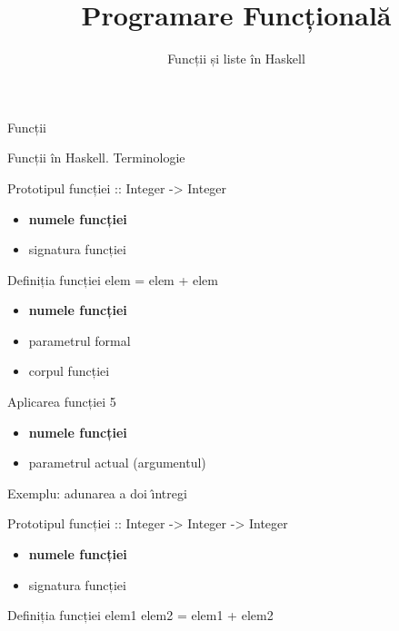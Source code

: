 \documentclass[xcolor=pdftex,romanian,colorlinks]{beamer}
\title[PF---Funcții și liste]{Programare Funcțională}
\subtitle{Funcții și liste în Haskell}
\date{}
\begin{document}
\begin{frame}
  \titlepage
\end{frame}

\begin{frame}
\frametitle{}
\tableofcontents
\end{frame}


\begin{section}{Funcții}

\begin{frame}{Funcții în Haskell. Terminologie}
\begin{block}{Prototipul funcției \hfill
{\color{black}{\bf double} {:: Integer -> Integer}}}
\begin{itemize}
\item {\bf numele funcției}
\item signatura funcției
\end{itemize}
\end{block}
\begin{block}{Definiția funcției \hfill {\color{black}{\bf double}} \alert{elem} {\color{black}= elem + elem}}

\begin{itemize}
\item {\bf numele funcției}
\item \alert{parametrul formal}
\item corpul funcției
\end{itemize}
\end{block}
\begin{block}{Aplicarea funcției \hfill {\color{black}{\bf double}} \alert{5}}
\begin{itemize}
\item {\bf numele funcției}
\item \alert{parametrul actual (argumentul)}
\end{itemize}
\end{block}
\end{frame}

\begin{frame}{Exemplu: adunarea a doi \^{\i}ntregi}
\begin{block}{Prototipul funcției \hfill
{\color{black}{\bf add} {:: Integer -> Integer  -> Integer}}}
\begin{itemize}
\item {\bf numele funcției}
\item signatura funcției
\end{itemize}
\end{block}
\begin{block}{Definiția funcției \hfill {\color{black}{\bf add}} \alert{elem1} \alert{elem2} {\color{black}= elem1 + elem2}}


\end{block}
\end{frame}
\end{section}
\end{document}
